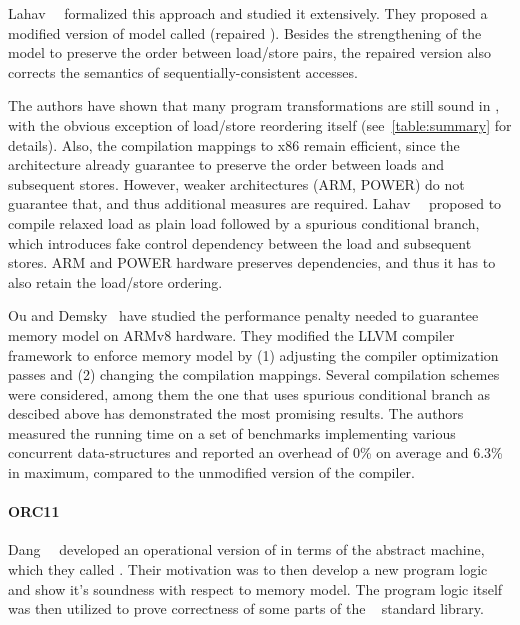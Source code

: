 Lahav~\etal~\cite{Lahav-al:PLDI17} formalized this approach and 
studied it extensively. They proposed a modified version 
of \CPP model called \RCMM (repaired \CMM).  
Besides the strengthening of the model to preserve 
the order between load/store pairs, 
the repaired version also corrects the semantics 
of sequentially-consistent accesses.

The authors have shown that many 
program transformations are still sound in \RCMM, 
with the obvious exception of load/store reordering itself
(see~\cref{table:summary} for details).
Also, the compilation mappings to x86 remain efficient, 
since the architecture already guarantee to preserve the order 
between loads and subsequent stores. 
However, weaker architectures (ARM, POWER) do not guarantee that, 
and thus additional measures are required.
Lahav~\etal~\cite{Lahav-al:PLDI17} proposed to compile relaxed load 
as plain load followed by a spurious conditional branch,
which introduces fake control dependency between 
the load and subsequent stores. 
ARM and POWER hardware preserves dependencies, 
and thus it has to also retain the load/store ordering. 

Ou and Demsky~\cite{Ou-Demsky:OOPSLA18} have studied 
the performance penalty needed to guarantee 
\RCMM memory model on ARMv8 hardware.
They modified the LLVM compiler framework 
to enforce \RCMM memory model
by (1) adjusting the compiler optimization passes and 
(2) changing the compilation mappings.
Several compilation schemes were considered,
among them the one that uses spurious conditional branch
as descibed above has demonstrated the most promising results.  
The authors measured the running time on a set of benchmarks 
implementing various concurrent data-structures
and reported an overhead of 0\% on average and 6.3\% in maximum,
compared to the unmodified version of the compiler. 

\paragraph{ORC11}

Dang~\etal~\cite{Dang-al:POPL19} developed an operational 
version of \RCMM in terms of the abstract machine, 
which they called \ORCMM. Their motivation was to 
then develop a new program logic and show it's soundness
with respect to \ORCMM memory model. 
The program logic itself was then utilized to 
prove correctness of some parts of 
the \Rust~\cite{RustBook:19} standard library.

